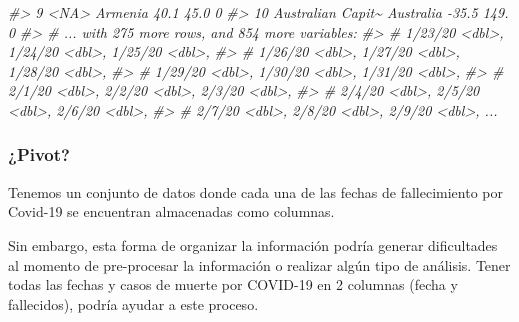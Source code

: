 \documentclass[
]{book}
\newenvironment{Shaded}{\begin{snugshade}}{\end{snugshade}}
\newcommand{\CommentTok}[1]{\textcolor[rgb]{0.56,0.35,0.01}{\textit{#1}}}
\begin{document}
\begin{Shaded}
\begin{Highlighting}[]
\CommentTok{\#\textgreater{}  9 \textless{}NA\textgreater{}              Armenia           40.1  45.0          0}
\CommentTok{\#\textgreater{} 10 Australian Capit\textasciitilde{} Australia        {-}35.5 149.           0}
\CommentTok{\#\textgreater{} \# ... with 275 more rows, and 854 more variables:}
\CommentTok{\#\textgreater{} \#   \textasciigrave{}1/23/20\textasciigrave{} \textless{}dbl\textgreater{}, \textasciigrave{}1/24/20\textasciigrave{} \textless{}dbl\textgreater{}, \textasciigrave{}1/25/20\textasciigrave{} \textless{}dbl\textgreater{},}
\CommentTok{\#\textgreater{} \#   \textasciigrave{}1/26/20\textasciigrave{} \textless{}dbl\textgreater{}, \textasciigrave{}1/27/20\textasciigrave{} \textless{}dbl\textgreater{}, \textasciigrave{}1/28/20\textasciigrave{} \textless{}dbl\textgreater{},}
\CommentTok{\#\textgreater{} \#   \textasciigrave{}1/29/20\textasciigrave{} \textless{}dbl\textgreater{}, \textasciigrave{}1/30/20\textasciigrave{} \textless{}dbl\textgreater{}, \textasciigrave{}1/31/20\textasciigrave{} \textless{}dbl\textgreater{},}
\CommentTok{\#\textgreater{} \#   \textasciigrave{}2/1/20\textasciigrave{} \textless{}dbl\textgreater{}, \textasciigrave{}2/2/20\textasciigrave{} \textless{}dbl\textgreater{}, \textasciigrave{}2/3/20\textasciigrave{} \textless{}dbl\textgreater{},}
\CommentTok{\#\textgreater{} \#   \textasciigrave{}2/4/20\textasciigrave{} \textless{}dbl\textgreater{}, \textasciigrave{}2/5/20\textasciigrave{} \textless{}dbl\textgreater{}, \textasciigrave{}2/6/20\textasciigrave{} \textless{}dbl\textgreater{},}
\CommentTok{\#\textgreater{} \#   \textasciigrave{}2/7/20\textasciigrave{} \textless{}dbl\textgreater{}, \textasciigrave{}2/8/20\textasciigrave{} \textless{}dbl\textgreater{}, \textasciigrave{}2/9/20\textasciigrave{} \textless{}dbl\textgreater{}, ...}
\end{Highlighting}
\end{Shaded}

\hypertarget{pivot}{%
\subsubsection{¿Pivot?}\label{pivot}}

Tenemos un conjunto de datos donde cada una de las fechas de fallecimiento por Covid-19 se encuentran almacenadas como columnas.

Sin embargo, esta forma de organizar la información podría generar dificultades al momento de pre-procesar la información o realizar algún tipo de análisis. Tener todas las fechas y casos de muerte por COVID-19 en 2 columnas (fecha y fallecidos), podría ayudar a este proceso.
\end{document}
